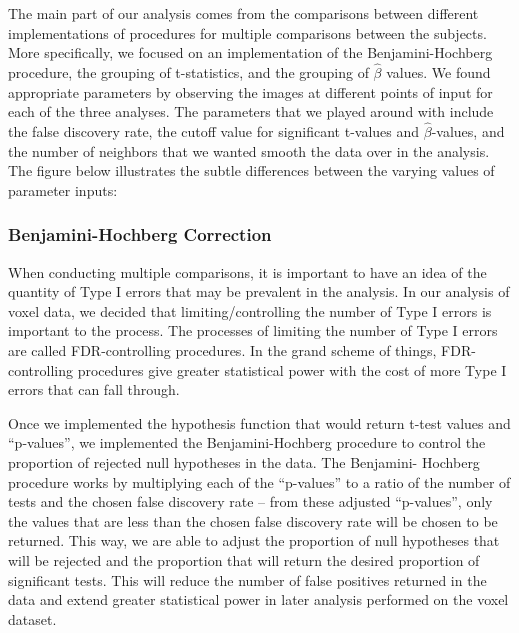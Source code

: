 The main part of our analysis comes from the comparisons between different 
implementations of procedures for multiple comparisons between the subjects.
More specifically, we focused on an implementation of the Benjamini-Hochberg 
procedure, the grouping of t-statistics, and the grouping of $\hat{\beta}$ 
values. We found appropriate parameters by observing the images at different 
points of input for each of the three analyses. The parameters that we played 
around with include the false discovery rate, the cutoff value for significant 
t-values and $\hat{\beta}$-values, and the number of neighbors that we wanted 
smooth the data over in the analysis. The figure below illustrates the subtle
differences between the varying values of parameter inputs:



\subsubsection{Benjamini-Hochberg Correction}

\par \indent When conducting multiple comparisons, it is important to have an 
idea of the quantity of Type I errors that may be prevalent in the analysis. 
In our analysis of voxel data, we decided that limiting/controlling the number 
of Type I errors is important to the process. The processes of limiting the 
number of Type I errors are called FDR-controlling procedures. In the grand 
scheme of things, FDR-controlling procedures give greater statistical power 
with the cost of more Type I errors that can fall through. 

\par Once we implemented the hypothesis function that would return t-test 
values and ``p-values'', we implemented the Benjamini-Hochberg procedure to 
control the proportion of rejected null hypotheses in the data. The Benjamini-
Hochberg procedure works by multiplying each of the ``p-values'' to a ratio of 
the number of tests and the chosen false discovery rate -- from these adjusted 
``p-values'', only the values that are less than the chosen false discovery rate 
will be chosen to be returned. This way, we are able to adjust the proportion of 
null hypotheses that will be rejected and the proportion that will return the 
desired proportion of significant tests. This will reduce the number of false 
positives returned in the data and extend greater statistical power in later 
analysis performed on the voxel dataset.

